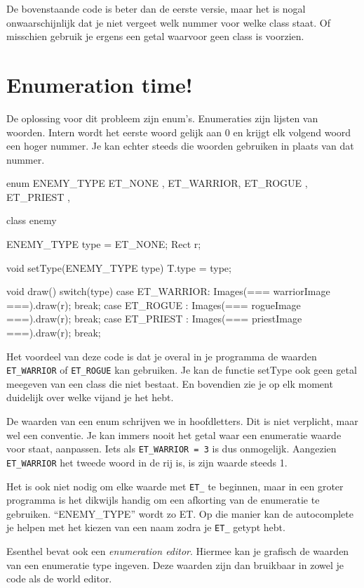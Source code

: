 De bovenstaande code is beter dan de eerste versie, maar het is nogal onwaarschijnlijk dat je niet vergeet welk nummer voor welke class staat. Of misschien gebruik je ergens een getal waarvoor geen class is voorzien. 

\section{Enumeration time!}
De oplossing voor dit probleem zijn enum's. Enumeraties zijn lijsten van woorden. Intern wordt het eerste woord gelijk aan 0 en krijgt elk volgend woord een hoger nummer. Je kan echter steeds die woorden gebruiken in plaats van dat nummer. 

\begin{code}
enum ENEMY_TYPE {
	ET_NONE   ,
  ET_WARRIOR,
  ET_ROGUE  ,
	ET_PRIEST , 
}

class enemy {
  ENEMY_TYPE type = ET_NONE;
	Rect r;
	
	void setType(ENEMY_TYPE type) {
		T.type = type;
	}
	
	void draw() {
		switch(type) {
			case ET_WARRIOR: Images(=== warriorImage ===).draw(r); break;
			case ET_ROGUE  : Images(=== rogueImage   ===).draw(r); break;
			case ET_PRIEST : Images(=== priestImage  ===).draw(r); break;
		}
	}
}
\end{code}

Het voordeel van deze code is dat je overal in je programma de waarden \texttt{ET\_WARRIOR} of \texttt{ET\_ROGUE} kan gebruiken. Je kan de functie setType ook geen getal meegeven van een class die niet bestaat. En bovendien zie je op elk moment duidelijk over welke vijand je het hebt. 

De waarden van een enum schrijven we in hoofdletters. Dit is niet verplicht, maar wel een conventie. Je kan immers nooit het getal waar een enumeratie waarde voor staat, aanpassen. Iets als \texttt{ET\_WARRIOR = 3} is dus onmogelijk. Aangezien \texttt{ET\_WARRIOR} het tweede woord in de rij is, is zijn waarde steeds 1.

Het is ook niet nodig om elke waarde met \texttt{ET\_} te beginnen, maar in een groter programma is het dikwijls handig om een afkorting van de enumeratie te gebruiken. ``ENEMY\_TYPE'' wordt zo ET. Op die manier kan de autocomplete je helpen met het kiezen van een naam zodra je \texttt{ET\_} getypt hebt.

\begin{note}
Esenthel bevat ook een \textsl{enumeration editor}. Hiermee kan je grafisch de waarden van een enumeratie type ingeven. Deze waarden zijn dan bruikbaar in zowel je code als de world editor.
\end{note}


